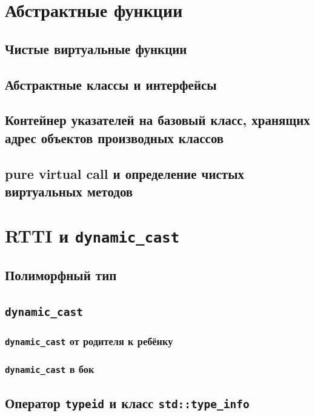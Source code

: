 \documentclass{article}
\begin{document}
\newpage


\section*{Абстрактные функции}
\subsection*{Чистые виртуальные функции}
\subsection*{Абстрактные классы и интерфейсы}
\subsection*{Контейнер указателей на базовый класс, хранящих адрес объектов производных классов}
\subsection*{pure virtual call и определение чистых виртуальных методов}


\section*{RTTI и \texttt{dynamic\_cast}}
\subsection*{Полиморфный тип}
\subsection*{\texttt{dynamic\_cast}}

\subsubsection*{\texttt{dynamic\_cast} от родителя к ребёнку}
\subsubsection*{\texttt{dynamic\_cast} в бок}

\subsection*{Оператор \texttt{typeid} и класс \texttt{std::type\_info}}
\end{document}
